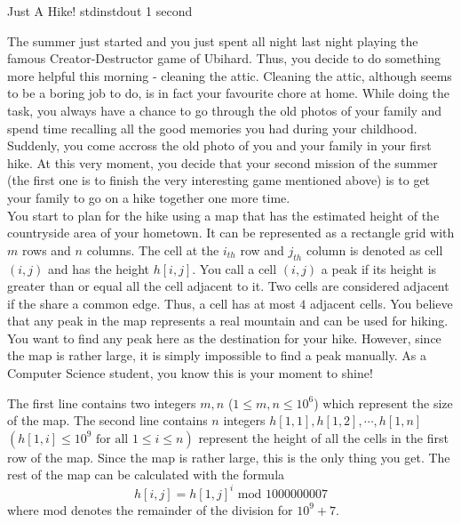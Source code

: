 
\begin{problem}{Just A Hike!}
{stdin}{stdout}
{1 second}{}{}

The summer just started and you just spent all night last night playing the famous Creator-Destructor game of Ubihard. 
Thus, you decide to do something more helpful this morning - cleaning the attic. Cleaning the attic, although seems to be
a boring job to do, is in fact your favourite chore at home. While doing the task, you always have a chance to go through 
the old photos of your family and spend time recalling all the good memories you had during your childhood. Suddenly, you 
come accross the old photo of you and your family in your first hike. At this very moment, you decide that your second
mission of the summer (the first one is to finish the very interesting game mentioned above) is to get your family to go
on a hike together one more time.\\

You start to plan for the hike using a map that has the estimated height of the countryside area of your hometown. It can be 
represented as a rectangle grid with $m$ rows and $n$ columns. The cell at the $i_{th}$ row and $j_{th}$ column is denoted 
as cell $(i, j)$ and has the height $h[i, j]$. You call a cell $(i, j)$ a peak if its height is greater than or equal all 
the cell adjacent to it. Two cells are considered adjacent if the share a common edge. Thus, a cell has at most $4$ adjacent 
cells. You believe that any peak in the map represents a real mountain and can be used for hiking. You want to find any peak 
here as the destination for your hike. However, since the map is rather large, it is simply impossible to find a peak manually.
As a Computer Science student, you know this is your moment to shine!

\InputFile

The first line contains two integers $m, n$ ($1 \leq m, n \leq 10^6$) which represent the size of the map. The second line
contains $n$ integers $h[1, 1], h[1, 2], \cdots, h[1, n]$ $(h[1, i] \leq 10^9 \text{ for all } 1 \leq i \leq n)$ represent 
the height of all the cells in the first row of the map. Since the map is rather large, this is the only thing you get. 
The rest of the map can be calculated with the formula
    \begin{equation}
       h[i, j] = h[1, j]^i \text{ mod } 1000000007
    \end{equation}
where mod denotes the remainder of the division for $10^9 + 7$.


\end{problem}
